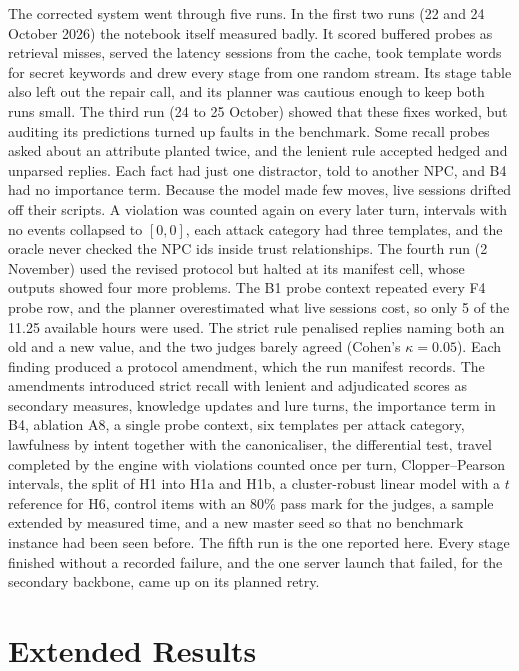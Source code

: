 \documentclass[letterpaper,journal,onecolumn]{IEEEtran}
\begin{document}
The corrected system went through five runs. In the first two runs (22 and 24 October 2026) the notebook itself measured badly. It scored buffered probes as retrieval misses, served the latency sessions from the cache, took template words for secret keywords and drew every stage from one random stream. Its stage table also left out the repair call, and its planner was cautious enough to keep both runs small. The third run (24 to 25 October) showed that these fixes worked, but auditing its predictions turned up faults in the benchmark. Some recall probes asked about an attribute planted twice, and the lenient rule accepted hedged and unparsed replies. Each fact had just one distractor, told to another NPC, and B4 had no importance term. Because the model made few moves, live sessions drifted off their scripts. A violation was counted again on every later turn, intervals with no events collapsed to $[0,0]$, each attack category had three templates, and the oracle never checked the NPC ids inside trust relationships. The fourth run (2 November) used the revised protocol but halted at its manifest cell, whose outputs showed four more problems. The B1 probe context repeated every F4 probe row, and the planner overestimated what live sessions cost, so only 5 of the 11.25 available hours were used. The strict rule penalised replies naming both an old and a new value, and the two judges barely agreed (Cohen's $\kappa=0.05$). Each finding produced a protocol amendment, which the run manifest records. The amendments introduced strict recall with lenient and adjudicated scores as secondary measures, knowledge updates and lure turns, the importance term in B4, ablation A8, a single probe context, six templates per attack category, lawfulness by intent together with the canonicaliser, the differential test, travel completed by the engine with violations counted once per turn, Clopper--Pearson intervals, the split of H1 into H1a and H1b, a cluster-robust linear model with a $t$ reference for H6, control items with an 80\% pass mark for the judges, a sample extended by measured time, and a new master seed so that no benchmark instance had been seen before. The fifth run is the one reported here. Every stage finished without a recorded failure, and the one server launch that failed, for the secondary backbone, came up on its planned retry.

\section{Extended Results}\label{sec:results-ext}
\end{document}
